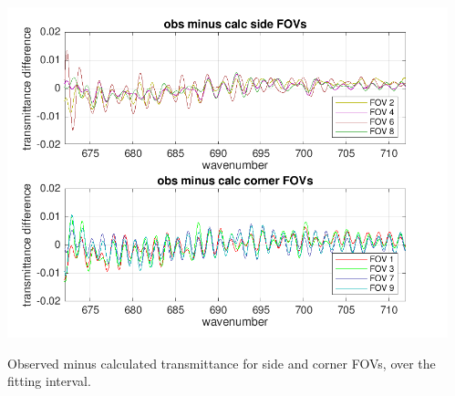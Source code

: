 \documentclass[10pt]{beamer}
\begin{document}
\begin{frame}
\begin{columns}[t]
\begin{column}{0.5\textwidth}
\end{column}
\begin{column}{0.5\textwidth}  
  \begin{centering}
  \includegraphics[width=\textwidth]{01-19_pfh_s2_CO2/CO2_breakout_2.png}
  \end{centering}\vspace{3mm}

Observed minus calculated transmittance for side and corner FOVs,
over the fitting interval.

\end{column}
\end{columns}
\end{frame}
\end{document}
